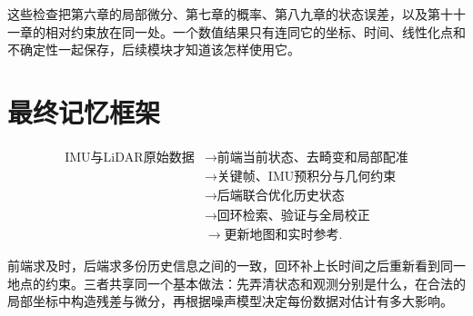 这些检查把第六章的局部微分、第七章的概率、第八九章的状态误差，以及第十十一章的相对约束放在同一处。一个数值结果只有连同它的坐标、时间、线性化点和不确定性一起保存，后续模块才知道该怎样使用它。

\section{最终记忆框架}

\begin{equation*}
\begin{aligned}
\text{IMU与LiDAR原始数据}
&\longrightarrow\text{前端当前状态、去畸变和局部配准}\\
&\longrightarrow\text{关键帧、IMU预积分与几何约束}\\
&\longrightarrow\text{后端联合优化历史状态}\\
&\longrightarrow\text{回环检索、验证与全局校正}\\
&\longrightarrow\text{更新地图和实时参考}.
\end{aligned}
\end{equation*}

前端求及时，后端求多份历史信息之间的一致，回环补上长时间之后重新看到同一地点的约束。三者共享同一个基本做法：先弄清状态和观测分别是什么，在合法的局部坐标中构造残差与微分，再根据噪声模型决定每份数据对估计有多大影响。
